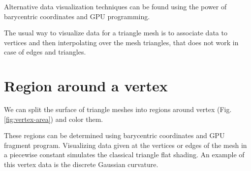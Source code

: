 Alternative data visualization techniques can be found using the power of barycentric coordinates and GPU programming.

The usual way to visualize data for a triangle mesh is to associate data to vertices and then interpolating over the mesh triangles, that does not work in case of edges and triangles.

\section{Region around a vertex}
We can split the surface of triangle meshes into regions around vertex (Fig. \ref{fig:vertex-area}) and color them.

These regions can be determined using barycentric coordinates and GPU fragment program. Visualizing data given at the vertices or edges of the mesh in a piecewise constant simulates the classical triangle flat shading.
An example of this vertex data is the discrete Gaussian curvature.
